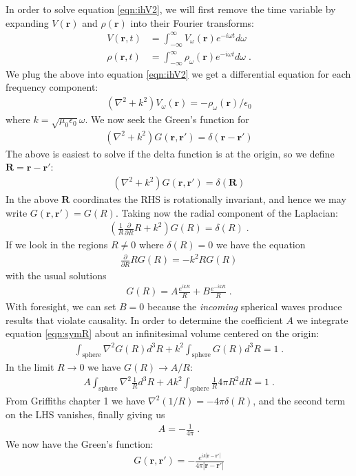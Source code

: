 \documentclass[12pt]{article}
\renewcommand{\vec}[1]{\boldsymbol{#1}}
\begin{document}
In order to solve equation \ref{eqn:ihV2}, we will first remove the time variable by expanding $V(\vec{r})$ and
$\rho(\vec{r})$ into their Fourier transforms:
\begin{align}
V(\vec{r}, t) &= \int_{-\infty}^{\infty} V_{\omega}(\vec{r})e^{- i\omega t} d\omega \\
    \rho(\vec{r}, t) &= \int_{-\infty}^{\infty} \rho_{\omega}(\vec{r})e^{- i\omega t} d\omega \;.
\end{align}
We plug the above into equation \ref{eqn:ihV2} we get a differential equation for each frequency component:
\begin{align}
(\nabla^2 + k^2) V_\omega(\vec{r}) = -\rho_\omega (\vec{r})/\epsilon_0
\end{align}
where $k = \sqrt{\mu_0\epsilon_0}\omega$.  We now seek the Green's function for
\begin{align}
 (\nabla^2 + k^2)G(\vec{r}, \vec{r}') = \delta(\vec{r}-\vec{r}')
\end{align}
The above is easiest to solve if the delta function is at the origin, so we define $\vec{R} = \vec{r}-\vec{r}'$:
\begin{align}
 (\nabla^2 + k^2)G(\vec{r}, \vec{r}') = \delta(\vec{R})
\end{align}
In the above $\vec{R}$ coordinates the RHS is rotationally invariant, and hence we may write 
$G(\vec{r}, \vec{r}') = G(R)$.  Taking now the radial component of the Laplacian:
\begin{align}\label{eqn:symR}
\left(\frac{1}{R}\frac{\partial}{\partial R}R + k^2\right)G(R) = \delta(R) \;.
\end{align}
If we look in the regions $R \ne 0$ where $\delta(R)=0$ we have the equation
\begin{align}
\frac{\partial}{\partial R}RG(R) =- k^2R G(R) 
\end{align}
with the usual solutions
\begin{align}
 G(R) = A \frac{e^{ikR}}{R} + B \frac{e^{-ikR}}{R} \;.
\end{align}
With foresight, we can set $B=0$ because the \emph{incoming} spherical waves produce results
that violate causality.  In order to determine the coefficient $A$ we integrate equation \ref{eqn:symR}
about an infinitesimal volume centered on the origin:
\begin{align}
\int_\text{sphere}\nabla^2 G(R) d^3R  + k^2 \int_\text{sphere} G(R) d^3R = 1 \;.
\end{align}
In the limit $R\rightarrow 0$ we have $G(R) \rightarrow A/R$:
\begin{align}
A \int_\text{sphere}\nabla^2 \frac{1}{R} d^3R  + A k^2 \int_\text{sphere} \frac{1}{R} 4\pi R^2dR = 1 \;.
\end{align}
From Griffiths chapter 1 we have $\nabla^2 (1/R) = -4\pi \delta(R)$, and the second term on the LHS 
vanishes, finally giving us
\begin{align}
 A = -\frac{1}{4\pi} \;.
\end{align}
We now have the Green's function:
\begin{align}
 G(\vec{r}, \vec{r}') = - \frac{e^{ik|\vec{r}-\vec{r}'|}}{4\pi |\vec{r}-\vec{r}'|}
\end{align}
\end{document}
